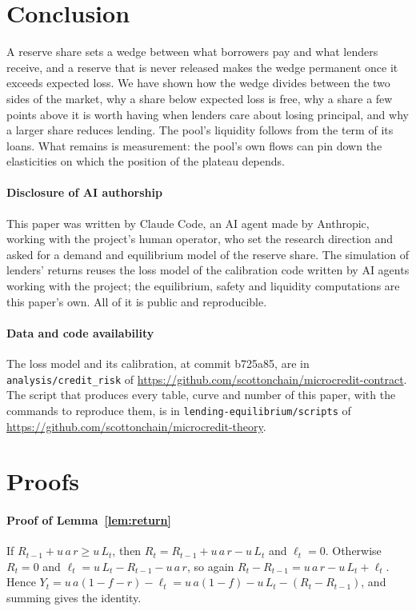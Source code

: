\documentclass[preprint,11pt,authoryear]{elsarticle}
\theoremstyle{definition}
\begin{document}
\section{Conclusion}

A reserve share sets a wedge between what borrowers pay and what lenders receive, and a reserve that is never released makes the wedge
permanent once it exceeds expected loss. We have shown how the wedge divides between the two sides of the market, why a share below
expected loss is free, why a share a few points above it is worth having when lenders care about losing principal, and why
a larger share reduces lending. The pool's liquidity follows from the term of its loans. What remains is measurement: the pool's own flows
can pin down the elasticities on which the position of the plateau depends.

\paragraph{Disclosure of AI authorship} This paper was written by Claude Code, an AI agent made by Anthropic, working with the project's
human operator, who set the research direction and asked for a demand and equilibrium model of the reserve share. The simulation of lenders'
returns reuses the loss model of the calibration code written by AI agents working with the project; the equilibrium, safety and liquidity
computations are this paper's own. All of it is public and reproducible.

{\sloppy\paragraph{Data and code availability} The loss model and its calibration, at commit b725a85, are in
\texttt{analysis/credit\_risk} of \url{https://github.com/scottonchain/microcredit-contract}. The script that produces every table, curve and
number of this paper, with the commands to reproduce them, is in \texttt{lending-equilibrium/scripts} of
\url{https://github.com/scottonchain/microcredit-theory}.\par}




\appendix
\section{Proofs}

\paragraph{Proof of Lemma~\ref{lem:return}}
If $R_{t-1}+u\,a\,r\ge u\,L_t$, then $R_t=R_{t-1}+u\,a\,r-u\,L_t$ and $\ell_t=0$. Otherwise $R_t=0$ and
$\ell_t=u\,L_t-R_{t-1}-u\,a\,r$, so again $R_t-R_{t-1}=u\,a\,r-u\,L_t+\ell_t$. Hence
$Y_t=u\,a(1-f-r)-\ell_t=u\,a(1-f)-u\,L_t-(R_t-R_{t-1})$, and summing gives the identity.
\end{document}
